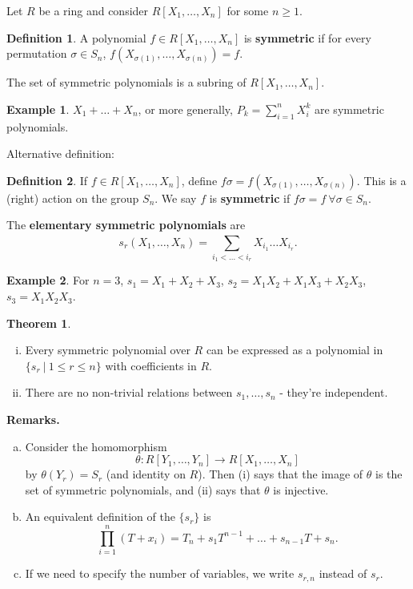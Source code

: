 \documentclass{article}
\theoremstyle{definition}
\newtheorem{theorem}{Theorem}[section]
\newtheorem{example}{Example}[section]
\newtheorem{defn}{Definition}[section]
\begin{document}
Let $R$ be a ring and consider $R[X_1, \ldots, X_n]$ for some $n\ge 1$.
\begin{defn}
    A polynomial $f \in R[X_1,\ldots, X_n]$ is \textbf{symmetric} if for every permutation $\sigma \in S_n$, $f(X_{\sigma(1)}, \ldots, X_{\sigma(n)}) = f$.
\end{defn}

The set of symmetric polynomials is a subring of $R[X_1,\ldots,X_n]$.

\begin{example}
    $X_1 + \ldots + X_n$, or more generally, $P_k = \sum_{i=1}^{n} X_i^k$ are symmetric polynomials.
\end{example}

Alternative definition:
\begin{defn}
    If $f \in R[X_1,\ldots,X_n]$, define $f \sigma = f(X_{\sigma(1)}, \ldots, X_{\sigma(n)})$. This is a (right) action on the group $S_n$. We say $f$ is \textbf{symmetric}  if $f \sigma = f ~\forall \sigma \in S_n$.
\end{defn}

The \textbf{elementary symmetric polynomials} are \[
    s_r(X_1, \ldots, X_n) = \sum_{i_1 < \ldots < i_r}^{} X_{i_1}\ldots X_{i_r}.
\]
\begin{example}
    For $n=3$, $s_1 = X_1 + X_2 + X_3$, $s_2 = X_1X_2 + X_1X_3 + X_2X_3$, $s_3 = X_1X_2X_3$.
\end{example}

\begin{theorem}%
    \begin{enumerate}[(i)]
        \item Every symmetric polynomial over $R$ can be expressed as a polynomial in $\{s_r ~|~ 1\le r\le n\}$ with coefficients in $R$.
        \item There are no non-trivial relations between $s_1, \ldots, s_n$ - they're independent.
    \end{enumerate}
\end{theorem}


\textbf{Remarks.} \begin{enumerate}[(a)]
    \item Consider the homomorphism $$\theta: R[Y_1,\ldots,Y_n] \to R[X_1,\ldots,X_n]$$ by ${\theta(Y_r) = S_r}$ (and identity on $R$). Then (i) says that the image of $\theta$ is the set of symmetric polynomials, and (ii) says that $\theta$ is injective.
    \item An equivalent definition of the $\{s_r\}$ is $$\prod_{i=1}^{n} (T+x_i) = T_n + s_1 T^{n-1} + \ldots + s_{n-1}T + s_n.$$
    \item If we need to specify the number of variables, we write $s_{r,n}$ instead of $s_r$.
\end{enumerate}
\end{document}

